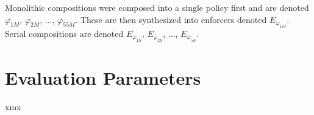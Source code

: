 Monolithic compositions were composed into a single policy first and are denoted $\varphi_{1M}$, $\varphi_{2M}$, ..., $\varphi_{55M}$. These are then synthesized into enforcers denoted $E_{\varphi_{1M}}$. Serial compositions are denoted $E_{\varphi_{1S}}$, $E_{\varphi_{2S}}$, ..., $E_{\varphi_{5S}}$.

\section{Evaluation Parameters}
\label{EvaluationParameters}

xmx




